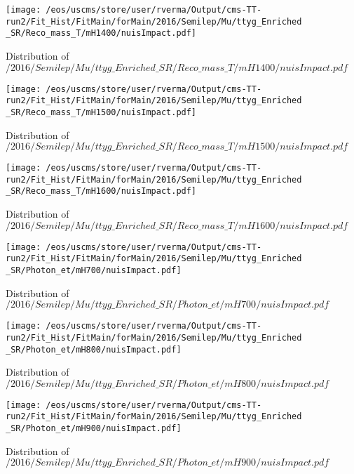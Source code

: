 \begin{figure}
\centering
\texttt{[image: /eos/uscms/store/user/rverma/Output/cms-TT-run2/Fit\_Hist/FitMain/forMain/2016/Semilep/Mu/ttyg\_Enriched\_SR/Reco\_mass\_T/mH1400/nuisImpact.pdf]}
\caption{Distribution of $/2016/Semilep/Mu/ttyg\_Enriched\_SR/Reco\_mass\_T/mH1400/nuisImpact.pdf$}
\end{figure}

\begin{figure}
\centering
\texttt{[image: /eos/uscms/store/user/rverma/Output/cms-TT-run2/Fit\_Hist/FitMain/forMain/2016/Semilep/Mu/ttyg\_Enriched\_SR/Reco\_mass\_T/mH1500/nuisImpact.pdf]}
\caption{Distribution of $/2016/Semilep/Mu/ttyg\_Enriched\_SR/Reco\_mass\_T/mH1500/nuisImpact.pdf$}
\end{figure}

\begin{figure}
\centering
\texttt{[image: /eos/uscms/store/user/rverma/Output/cms-TT-run2/Fit\_Hist/FitMain/forMain/2016/Semilep/Mu/ttyg\_Enriched\_SR/Reco\_mass\_T/mH1600/nuisImpact.pdf]}
\caption{Distribution of $/2016/Semilep/Mu/ttyg\_Enriched\_SR/Reco\_mass\_T/mH1600/nuisImpact.pdf$}
\end{figure}

\begin{figure}
\centering
\texttt{[image: /eos/uscms/store/user/rverma/Output/cms-TT-run2/Fit\_Hist/FitMain/forMain/2016/Semilep/Mu/ttyg\_Enriched\_SR/Photon\_et/mH700/nuisImpact.pdf]}
\caption{Distribution of $/2016/Semilep/Mu/ttyg\_Enriched\_SR/Photon\_et/mH700/nuisImpact.pdf$}
\end{figure}

\begin{figure}
\centering
\texttt{[image: /eos/uscms/store/user/rverma/Output/cms-TT-run2/Fit\_Hist/FitMain/forMain/2016/Semilep/Mu/ttyg\_Enriched\_SR/Photon\_et/mH800/nuisImpact.pdf]}
\caption{Distribution of $/2016/Semilep/Mu/ttyg\_Enriched\_SR/Photon\_et/mH800/nuisImpact.pdf$}
\end{figure}

\begin{figure}
\centering
\texttt{[image: /eos/uscms/store/user/rverma/Output/cms-TT-run2/Fit\_Hist/FitMain/forMain/2016/Semilep/Mu/ttyg\_Enriched\_SR/Photon\_et/mH900/nuisImpact.pdf]}
\caption{Distribution of $/2016/Semilep/Mu/ttyg\_Enriched\_SR/Photon\_et/mH900/nuisImpact.pdf$}
\end{figure}

